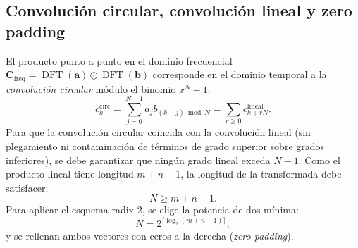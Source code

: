 \subsection{Convolución circular, convolución lineal y zero padding}
El producto punto a punto en el dominio frecuencial $\mathbf{C}_{\text{freq}} = \operatorname{DFT}(\mathbf{a}) \odot \operatorname{DFT}(\mathbf{b})$ corresponde en el dominio temporal a la \emph{convolución circular} módulo el binomio $x^N - 1$:
\begin{equation}
c_k^{\text{circ}} = \sum_{j=0}^{N-1} a_j b_{(k - j) \bmod N} = \sum_{r \ge 0} c_{k + rN}^{\text{lineal}}.
\end{equation}
Para que la convolución circular coincida con la convolución lineal (sin plegamiento ni contaminación de términos de grado superior sobre grados inferiores), se debe garantizar que ningún grado lineal exceda $N - 1$. Como el producto lineal tiene longitud $m+n-1$, la longitud de la transformada debe satisfacer:
\begin{equation}
N \ge m + n - 1.
\end{equation}
Para aplicar el esquema radix-2, se elige la potencia de dos mínima:
\begin{equation}
N = 2^{\lceil \log_2(m+n-1) \rceil},
\end{equation}
y se rellenan ambos vectores con ceros a la derecha (\emph{zero padding}).

